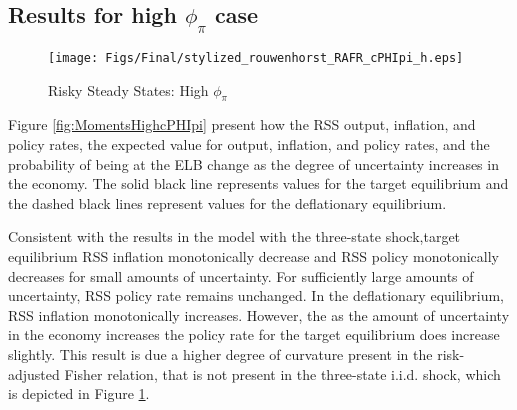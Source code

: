 \documentclass[11pt]{article}
\begin{document}
	
	
	
	\subsection{Results for high $\phi_{\pi}$ case}	
	
	
	\begin{figure}[h]  %
		\begin{center}
			\caption{Risky Steady States: High $\phi_{\pi}$}
			\texttt{[image: Figs/Final/stylized\_rouwenhorst\_RAFR\_cPHIpi\_h.eps]}
			\label{fig:RAFR_nar1_high_cPHIpi}
		\end{center}
	\end{figure}
	
	
	Figure \ref{fig:MomentsHighcPHIpi} present how the RSS output, inflation, and policy rates, the expected value for output, inflation, and policy rates, and the probability of being at the ELB change as the degree of uncertainty increases in the economy. The solid black line represents values for the target equilibrium and the dashed black lines represent values for the deflationary equilibrium.
	
	Consistent with the results in the model with the three-state shock,target equilibrium RSS inflation monotonically decrease and RSS policy monotonically decreases for small amounts of uncertainty. For sufficiently large amounts of uncertainty, RSS policy rate remains unchanged. In the deflationary equilibrium, RSS inflation monotonically increases. However, the as the amount of uncertainty in the economy increases the policy rate for the target equilibrium does increase slightly. This result is due a higher degree of curvature present in the risk-adjusted Fisher relation, that is not present in the three-state i.i.d. shock, which is depicted in Figure \ref{fig:RAFR_nar1_high_cPHIpi}. %
	
	
	\newpage
\end{document}
